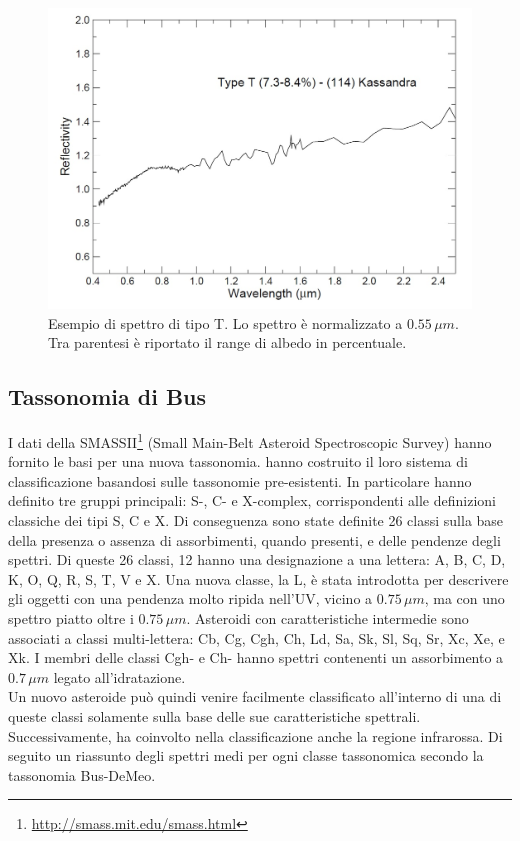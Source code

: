 \documentclass[a4paper,11pt,openright]{book}
\begin{document}
\begin{figure}[!h]
    \centering
    \includegraphics[scale=0.3]{figure/spettro_t.jpg}
    \caption[Esempio di spettro di tipo T.]{Esempio di spettro di tipo T. Lo spettro è normalizzato a $0.55\,\mu m$. Tra parentesi è riportato il range di albedo in percentuale. \citep{magrin_spectroscopic_nodate}}
    \label{spettro_t}
\end{figure}

\subsection{Tassonomia di Bus}
I dati della SMASSII\footnote{\href{http://smass.mit.edu/smass.html}{http://smass.mit.edu/smass.html}} (Small Main-Belt Asteroid Spectroscopic Survey) hanno fornito le basi per una nuova tassonomia. \citet{bus_phase_2002, bus_phase_2002-1} hanno costruito il loro sistema di classificazione basandosi sulle tassonomie pre-esistenti. In particolare hanno definito tre gruppi principali: S-, C- e X-complex, corrispondenti alle definizioni classiche dei tipi S, C e X. Di conseguenza sono state definite 26 classi sulla base della presenza o assenza di assorbimenti, quando presenti, e delle pendenze degli spettri. Di queste 26 classi, 12 hanno una designazione a una lettera: A, B, C, D, K, O, Q, R, S, T, V e X. Una nuova classe, la L, è stata introdotta per descrivere gli oggetti con una pendenza molto ripida nell'UV, vicino a $0.75\,\mu m$, ma con uno spettro piatto oltre i $0.75\,\mu m$. Asteroidi con caratteristiche intermedie sono associati a classi multi-lettera: Cb, Cg, Cgh, Ch, Ld, Sa, Sk, Sl, Sq, Sr, Xc, Xe, e Xk. I membri delle classi Cgh- e Ch- hanno spettri contenenti un assorbimento a $0.7\,\mu m$ legato all'idratazione.\\
Un nuovo asteroide può quindi venire facilmente classificato all’interno di una di queste classi solamente sulla base delle sue caratteristiche spettrali. Successivamente, \citet{demeo_extension_2009} ha coinvolto nella classificazione anche la regione infrarossa. Di seguito un riassunto degli spettri medi per ogni classe tassonomica secondo la tassonomia Bus-DeMeo.
\end{document}
